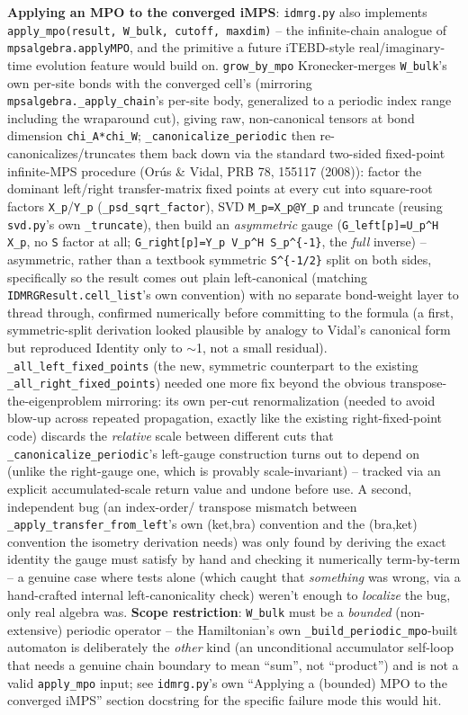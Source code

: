 \documentclass[11pt]{article}
\begin{document}
\textbf{Applying an MPO to the converged iMPS}: \texttt{idmrg.py} also
implements \texttt{apply\_mpo(result, W\_bulk, cutoff, maxdim)} -- the
infinite-chain analogue of \texttt{mpsalgebra.applyMPO}, and the
primitive a future iTEBD-style real/imaginary-time evolution feature
would build on. \texttt{grow\_by\_mpo} Kronecker-merges \texttt{W\_bulk}'s
own per-site bonds with the converged cell's (mirroring
\texttt{mpsalgebra.\_apply\_chain}'s per-site body, generalized to a
periodic index range including the wraparound cut), giving raw,
non-canonical tensors at bond dimension \texttt{chi\_A*chi\_W};
\texttt{\_canonicalize\_periodic} then re-canonicalizes/truncates them
back down via the standard two-sided fixed-point infinite-MPS procedure
(Or\'us \& Vidal, PRB 78, 155117 (2008)): factor the dominant left/right
transfer-matrix fixed points at every cut into square-root factors
\texttt{X\_p}/\texttt{Y\_p} (\texttt{\_psd\_sqrt\_factor}), SVD
\texttt{M\_p=X\_p@Y\_p} and truncate (reusing \texttt{svd.py}'s own
\texttt{\_truncate}), then build an \emph{asymmetric} gauge
(\texttt{G\_left[p]=U\_p\^{}H X\_p}, no \texttt{S} factor at all;
\texttt{G\_right[p]=Y\_p V\_p\^{}H S\_p\^{}\{-1\}}, the \emph{full}
inverse) -- asymmetric, rather than a textbook symmetric
\texttt{S\^{}\{-1/2\}} split on both sides, specifically so the result
comes out plain left-canonical (matching
\texttt{IDMRGResult.cell\_list}'s own convention) with no separate bond-weight layer to thread through,
confirmed numerically before committing to the formula (a first,
symmetric-split derivation looked plausible by analogy to Vidal's
canonical form but reproduced Identity only to $\sim$1, not a small
residual). \texttt{\_all\_left\_fixed\_points} (the new, symmetric
counterpart to the existing \texttt{\_all\_right\_fixed\_points}) needed
one more fix beyond the obvious transpose-the-eigenproblem mirroring:
its own per-cut renormalization (needed to avoid blow-up across repeated
propagation, exactly like the existing right-fixed-point code) discards
the \emph{relative} scale between different cuts that
\texttt{\_canonicalize\_periodic}'s left-gauge construction turns out to
depend on (unlike the right-gauge one, which is provably
scale-invariant) -- tracked via an explicit accumulated-scale return
value and undone before use. A second, independent bug (an index-order/
transpose mismatch between \texttt{\_apply\_transfer\_from\_left}'s own
(ket,bra) convention and the (bra,ket) convention the isometry
derivation needs) was only found by deriving the exact identity the
gauge must satisfy by hand and checking it numerically term-by-term --
a genuine case where tests alone (which caught that \emph{something}
was wrong, via a hand-crafted internal left-canonicality check) weren't
enough to \emph{localize} the bug, only real algebra was. \textbf{Scope
restriction}: \texttt{W\_bulk} must be a \emph{bounded} (non-extensive)
periodic operator -- the Hamiltonian's own
\texttt{\_build\_periodic\_mpo}-built automaton is deliberately the
\emph{other} kind (an unconditional accumulator self-loop that needs a
genuine chain boundary to mean ``sum'', not ``product'') and is not a
valid \texttt{apply\_mpo} input; see \texttt{idmrg.py}'s own ``Applying
a (bounded) MPO to the converged iMPS'' section docstring for the
specific failure mode this would hit.
\end{document}
